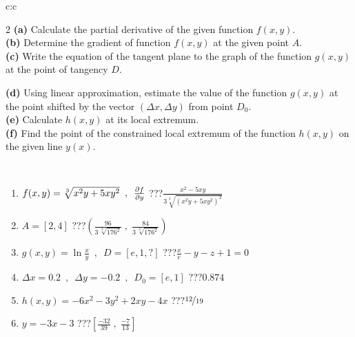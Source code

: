 \documentclass[10pt]{report}
\begin{document}
\begin{tabular}{c:c}
\begin{minipage}[c][104.5mm][t]{0.5\linewidth}
\begin{center}
\begin{minipage}{0.95\linewidth}
\begin{center}
{\begin{multicols}{2}
\textbf{(a)} Calculate the partial derivative of the given function \(f(x,y)\). \\[1mm]
\textbf{(b)} Determine the gradient of function \(f(x,y)\) at the given point \(A\). \\[1mm]
\textbf{(c)} Write the equation of the tangent plane to the graph of the function \(g(x,y)\) at the point of tangency \(D\). \par \columnbreak
\textbf{(d)} Using linear approximation, estimate the value of the function \(g(x,y)\) at the point shifted by the vector \((\Delta x, \Delta y)\) from point \(D_0\). \\[1mm]
\textbf{(e)} Calculate \(h(x,y)\) at its local extremum. \\[1mm]
\textbf{(f)} Find the point of the constrained local extremum of the function \(h(x,y)\) on the given line \(y(x)\). \\[1mm]
\end{multicols}
}
\end{center}
\end{minipage}
\\[4mm]
\begin{minipage}{0.79\linewidth}
\begin{center}
\begin{varwidth}{\linewidth}
\begin{enumerate}
\normalsizerr
\item $f(x,y) = \sqrt[3]{x^2y + 5xy^2}\enspace , \enspace \pdv{f}{y}$\quad \dotfill\; ???\;\dotfill \quad $\frac{x^2-5xy}{3\sqrt[3]{(x^2y+5xy^2)^{2}}}$
\item $A = [2, 4]$\quad \dotfill\; ???\;\dotfill \quad $\left( \frac{96}{3\,\sqrt[3]{176^2}} \;,\; \frac{84}{3\,\sqrt[3]{176^2}} \right)$
\item $g(x,y) = \ln\frac{x}{y} \enspace , \enspace D=[e,1,?]$\quad \dotfill\; ???\;\dotfill \quad $\frac{x}{e} - y - z + 1 = 0$
\item $\Delta x = {0.2} \enspace,\enspace \Delta y = {-0.2} \enspace,\enspace D_0 = [e,1]$\quad \dotfill\; ???\;\dotfill \quad $0.874$
\item $h(x,y) = -6x^2-3y^2+2xy-4x$\quad \dotfill\; ???\;\dotfill \quad $\nicefrac{12}{19}$
\item $y = -3x-3$\quad \dotfill\; ???\;\dotfill \quad $\left[\frac{-32}{39}\;,\;\frac{-7}{13}\right]$
\end{enumerate}
\end{varwidth}
\end{center}
\end{minipage}

\end{center}
\end{minipage}
\end{tabular}
\end{document}

